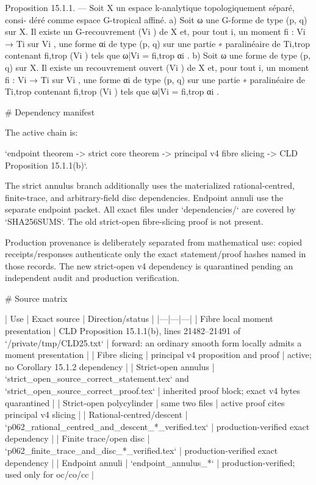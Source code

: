 Proposition 15.1.1. — Soit X un espace k-analytique topologiquement séparé, consi-
déré comme espace G-tropical affiné.
   a) Soit ω une G-forme de type (p, q) sur X. Il existe un G-recouvrement (Vi ) de X et,
pour tout i, un moment fi : Vi → Ti sur Vi , une forme αi de type (p, q) sur une partie
                                                                 ∗
paralinéaire de Ti,trop contenant fi,trop (Vi ) tels que ω|Vi = fi,trop αi .
   b) Soit ω une forme de type (p, q) sur X. Il existe un recouvrement ouvert (Vi ) de X
et, pour tout i, un moment fi : Vi → Ti sur Vi , une forme αi de type (p, q) sur une partie
                                                                 ∗
paralinéaire de Ti,trop contenant fi,trop (Vi ) tels que ω|Vi = fi,trop αi .

# Dependency manifest

The active chain is:

`endpoint theorem -> strict core theorem -> principal v4 fibre slicing -> CLD Proposition 15.1.1(b)`.

The strict annulus branch additionally uses the materialized rational-centred,
finite-trace, and arbitrary-field disc dependencies.  Endpoint annuli use the
separate endpoint packet.  All exact files under `dependencies/` are covered
by `SHA256SUMS`.  The old strict-open fibre-slicing proof is not present.

Production provenance is deliberately separated from mathematical use: copied
receipts/responses authenticate only the exact statement/proof hashes named in
those records.  The new strict-open v4 dependency is quarantined pending an
independent audit and production verification.

# Source matrix

| Use | Exact source | Direction/status |
|---|---|---|
| Fibre local moment presentation | CLD Proposition 15.1.1(b), lines 21482--21491 of `/private/tmp/CLD25.txt` | forward: an ordinary smooth form locally admits a moment presentation |
| Fibre slicing | principal v4 proposition and proof | active; no Corollary 15.1.2 dependency |
| Strict-open annulus | `strict_open_source_correct_statement.tex` and `strict_open_source_correct_proof.tex` | inherited proof block; exact v4 bytes quarantined |
| Strict-open polycylinder | same two files | active proof cites principal v4 slicing |
| Rational-centred/descent | `p062_rational_centred_and_descent_*_verified.tex` | production-verified exact dependency |
| Finite trace/open disc | `p062_finite_trace_and_disc_*_verified.tex` | production-verified exact dependency |
| Endpoint annuli | `endpoint_annulus_*` | production-verified; used only for oc/co/cc |

